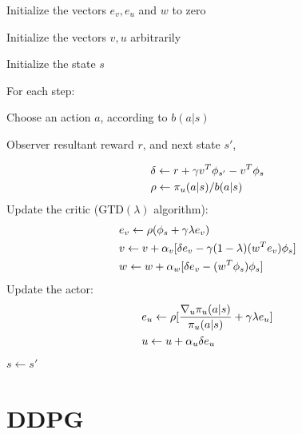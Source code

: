 \documentclass[11pt,a4paper]{article}
\begin{document}
\begin{tcolorbox}[title=Off-PAC algorithm]
Initialize the vectors $e_v,e_u$ and $w$ to zero\par 
Initialize the vectors $v, u$ arbitrarily \par 
Initialize the state $s$ \par 
For each step: \par 
\hspace{1cm} Choose an action $a$, according to $b(a|s)$ \par 
\hspace{1cm} Observer resultant reward $r$, and next state $s'$, \par 
\begin{equation*}
\aligned 
& \delta \leftarrow r + \gamma v^T\phi_{s'} - v^T\phi_s \\ 
& \rho \leftarrow \pi_{u}(a|s)/b(a|s)
\endaligned
\end{equation*}
\hspace{1cm} Update the critic (GTD$(\lambda)$ algorithm):
\hspace{2cm}
\begin{equation*}
\aligned 
& e_v \leftarrow \rho(\phi_s + \gamma \lambda e_v) \\ 
& v \leftarrow v + \alpha_v [\delta e_v - \gamma(1-\lambda)(w^Te_v)\phi_s] \\ 
& w \leftarrow w + \alpha_w[\delta e_v - (w^T\phi_s)\phi_s]
\endaligned
\end{equation*}
\hspace{1cm} Update the actor:
\begin{equation*}
\aligned 
& e_u \leftarrow \rho[\frac{\nabla_u \pi_u(a|s)}{\pi_u(a|s)} + \gamma\lambda e_u] \\ 
& u \leftarrow u + \alpha_u \delta e_u
\endaligned
\end{equation*}
\hspace{1cm} $s \leftarrow s'$
\end{tcolorbox}



\section{DDPG}
\end{document}
